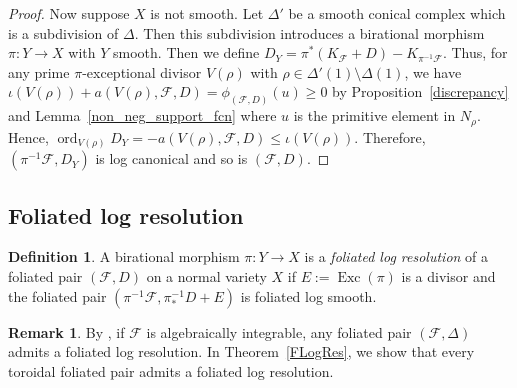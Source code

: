 \documentclass[12pt,reqno]{amsart}
\theoremstyle{definition}
\newtheorem{definition}[theorem]{Definition}
\newtheorem{remark}[theorem]{Remark}
\newcommand{\on}{\operatorname}
\newcommand\cF{{\mathcal{F}}}
\begin{document}
\begin{proof}
    Now suppose $X$ is not smooth. 
    Let $\Delta'$ be a smooth conical complex which is a subdivision of $\Delta$. 
    Then this subdivision introduces a birational morphism $\pi\colon Y\to X$ with $Y$ smooth. 
    Then we define $D_Y = \pi^*(K_\cF+D)-K_{\pi^{-1}\cF}$. 
    Thus, for any prime $\pi$-exceptional divisor $V(\rho)$ with $\rho\in\Delta'(1)\setminus\Delta(1)$, we have $\iota(V(\rho)) + a(V(\rho),\cF,D) = \phi_{(\cF,D)}(u)\geq 0$ by Proposition~\ref{discrepancy} and Lemma~\ref{non_neg_support_fcn} where $u$ is the primitive element in $N_\rho$. 
    Hence, $\on{ord}_{V(\rho)}D_Y = -a(V(\rho),\cF,D)\leq\iota(V(\rho))$. 
    Therefore, $(\pi^{-1}\cF,D_Y)$ is log canonical and so is $(\cF,D)$. 
\end{proof}


\subsection{Foliated log resolution}

\begin{definition}\label{fol_log_res_defn}
    A birational morphism $\pi\colon Y\to X$ is a \emph{foliated log resolution} of a foliated pair $(\cF,D)$ on a normal variety $X$ if $E:=\on{Exc}(\pi)$ is a divisor and the foliated pair $(\pi^{-1}\cF,\pi_*^{-1}D+E)$ is foliated log smooth.
\end{definition}

\begin{remark}
    By \cite[Theorem 2.1 and Proposition 4.4]{AK00}, if $\cF$ is algebraically integrable, any foliated pair $(\cF,\Delta)$ admits a foliated log resolution. 
    In Theorem~\ref{FLogRes}, we show that every toroidal foliated pair admits a foliated log resolution.
\end{remark}
\end{document}
